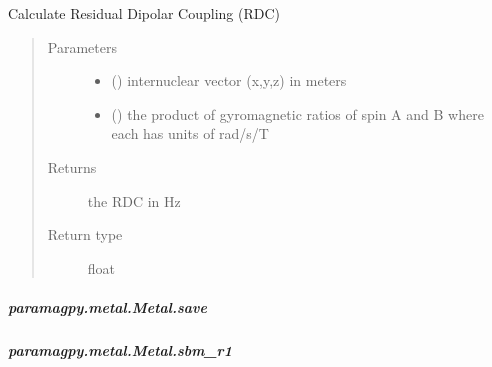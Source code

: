 \documentclass[a4paper,10pt,english]{sphinxmanual}
\begin{document}
\begin{fulllineitems}
\begin{fulllineitems}
\begin{fulllineitems}
\label{\detokenize{reference/generated/paramagpy.metal.Metal.rdc:paramagpy.metal.Metal.rdc}}
Calculate Residual Dipolar Coupling (RDC)
\begin{quote}\begin{description}
\item[{Parameters}] \leavevmode\begin{itemize}
\item {} 
 () \textendash{} internuclear vector (x,y,z) in meters

\item {} 
 () \textendash{} the product of gyromagnetic ratios of spin A and B
where each has units of rad/s/T

\end{itemize}

\item[{Returns}] \leavevmode
{} \textendash{} the RDC in Hz

\item[{Return type}] \leavevmode
float

\end{description}\end{quote}

\end{fulllineitems}



\subparagraph{paramagpy.metal.Metal.save}
\label{\detokenize{reference/generated/paramagpy.metal.Metal.save:paramagpy-metal-metal-save}}\label{\detokenize{reference/generated/paramagpy.metal.Metal.save::doc}}

\begin{fulllineitems}
\label{\detokenize{reference/generated/paramagpy.metal.Metal.save:paramagpy.metal.Metal.save}}
\end{fulllineitems}



\subparagraph{paramagpy.metal.Metal.sbm\_r1}
\label{\detokenize{reference/generated/paramagpy.metal.Metal.sbm_r1:paramagpy-metal-metal-sbm-r1}}\label{\detokenize{reference/generated/paramagpy.metal.Metal.sbm_r1::doc}}


\end{fulllineitems}
\end{fulllineitems}
\end{document}
